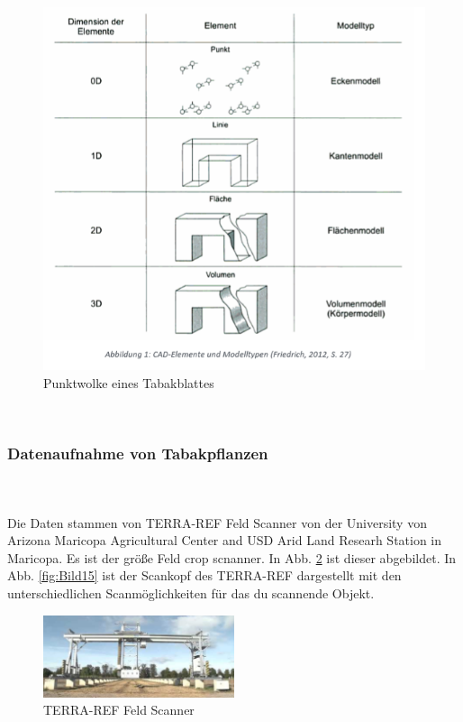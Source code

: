 \documentclass{llncs}
\begin{document}
	\begin{figure}[htbp] 
		\centering
		\includegraphics[width=1.0\textwidth]{datenformat.png}
		\caption{Punktwolke eines Tabakblattes}
		\label{fig:Bild12}
	\end{figure}
	\\
	\subsubsection{Datenaufnahme von Tabakpflanzen}
	~\\\\
	Die Daten stammen von TERRA-REF Feld Scanner von der University von Arizona Maricopa Agricultural Center and USD Arid Land Researh Station in Maricopa. Es ist der größe Feld crop scnanner. In Abb. \ref{fig:Bild14} ist dieser abgebildet. In Abb. \ref{fig:Bild15} ist der Scankopf des TERRA-REF dargestellt mit den unterschiedlichen Scanmöglichkeiten für das du scannende Objekt. 
	
	\begin{figure}[htbp] 
		\centering
		\includegraphics[width=0.5\textwidth]{lematech_1.png}
		\caption{TERRA-REF Feld Scanner}
		\label{fig:Bild14}
	\end{figure}
	
\end{document}
